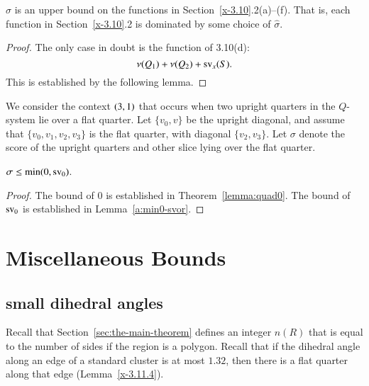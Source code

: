 \begin{lemma}
    \label{lemma:hatsigma}
$\hat\sigma$ is an upper bound on the functions in
Section~\ref{x-3.10}.2(a)--(f). That is, each function in
Section~\ref{x-3.10}.2 is dominated by some choice of $\hat\sigma$.
\end{lemma}

\begin{proof}  The only case in doubt is the function of 3.10(d):
$$\nu(Q_1)+\nu(Q_2)+{\operatorname{sv}}_x(S).$$ This is established by the
following lemma.
\end{proof}


We consider the context $\relax(3,1)$ that occurs when two upright
quarters in the $Q$-system lie over a flat quarter. Let $\{v_0,v\}$ be
the upright diagonal, and assume that $\{v_0,v_1,v_2,v_3\}$ is the
flat quarter, with diagonal $\{v_2,v_3\}$. Let $\sigma$ denote the
score of the upright quarters and other slice lying
over the flat quarter.

\begin{lemma}\label{lemma:min0-svor}
    $\sigma\le \min(0,{\operatorname{sv}}_0)$.
\end{lemma}

\begin{proof}
The bound of $0$ is established in Theorem~\ref{lemma:quad0}.
The bound of ${\operatorname{sv}}_0$ is established in Lemma~\ref{a:min0-svor}.
\end{proof}



    \label{sec:fb}




\section{Miscellaneous Bounds}
\subsection{small dihedral angles} %
\label{sec:small-dih}

Recall that Section~\ref{sec:the-main-theorem} defines an integer $n(R)$
that is equal to the number of sides if the region is a polygon.  Recall
that if the dihedral angle along an edge of a standard cluster is at
most $1.32$, then there is a flat quarter along that edge
(Lemma~\ref{x-3.11.4}).

